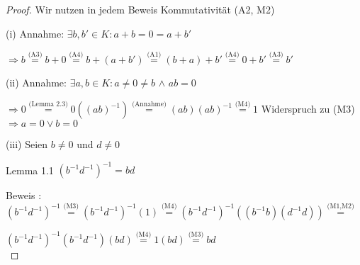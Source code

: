 \documentclass[12pt, letterpaper]{article}
\begin{document}
\begin{proof} Wir nutzen in jedem Beweis Kommutativität (A2, M2)
    \\ \hspace*{10mm} \par
    (i) Annahme: $\exists b,b' \in K : a+b=0=a+b'$ 
        \par
        $\Rightarrow b \overset{\text{(A3)}}{=} b + 0 \overset{\text{(A4)}}{=} b + (a + b') \overset{\text{(A1)}}{=} 
        (b + a) + b' \overset{\text{(A4)}}{=} 0 + b' \overset{\text{(A3)}}{=} b' $
    \\ \par
    (ii) Annahme: $\exists a,b \in K : a \neq 0 \neq b$ $\land$ $ab=0$ 
        \par
        $\Rightarrow 0 \overset{\text{(Lemma 2.3)}}{=} 0((ab)^{-1}) \overset{\text{(Annahme)}}{=} 
        (ab)(ab)^{-1} \overset{\text{(M4)}}{=} 1$ Widerspruch zu (M3) $\Rightarrow a=0 \lor b = 0$
    \\ \par
    (iii) Seien $ b \neq 0$ und $d \neq 0$ \par \hspace*{7mm} 
        Lemma 1.1 $(b^{-1}d^{-1})^{-1} = bd $ \par \hspace*{7mm} \hspace*{7mm} 
        Beweis : $(b^{-1}d^{-1})^{-1} \overset{\text{(M3)}}{=} (b^{-1}d^{-1})^{-1}(1) \overset{\text{(M4)}}{=} (b^{-1}d^{-1})^{-1}((b^{-1}b)(d^{-1}d)) 
                \overset{\text{(M1,M2)}}{=}$ \par \hspace*{33mm}
                $(b^{-1}d^{-1})^{-1}(b^{-1}d^{-1})(bd) \overset{\text{(M4)}}{=} 1(bd) \overset{\text{(M3)}}{=} bd $ \\


\end{proof}
\end{document}
